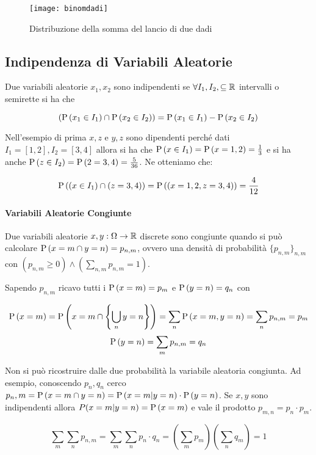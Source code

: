 \begin{figure}[H]
	\centering
	\caption{Distribuzione della somma del lancio di due dadi}
	\texttt{[image: binomdadi]}
\end{figure}


\subsection{Indipendenza di Variabili Aleatorie}

Due variabili aleatorie $ x_1, x_2 $ sono indipendenti se $ \forall I_1, I_2, \subseteq \mathbb{R} $ intervalli o semirette si ha che 

\[ \left( \text{P}\left(x_1 \in I_1\right) \cap \text{P}\left(x_2 \in I_2\right) \right) = \text{P}\left(x_1 \in I_1\right) - \text{P}\left(x_2 \in I_2\right) \]

Nell'esempio di prima $ x, z $ e $ y,z $ sono dipendenti perché dati $ I_1 = [1,2], I_2 = [3,4] $ allora si ha che $ \text{P}\left(x\in I_1\right) = \text{P}\left(x=1,2\right) = \frac{1}{3} $ e si ha anche $ \text{P}\left(z \in I_2\right) = \text{P}\left(2 = 3,4\right) = \frac{5}{36} $. Ne otteniamo che:


\[ \text{P}\left((x \in I_1) \cap (z = 3,4)\right) = \text{P}\left((x = 1,2, z = 3,4)\right) = \dfrac{4}{12} \]

\paragraph{Variabili Aleatorie Congiunte}
Due variabili aleatorie $ x,y : \Omega \to \mathbb{R} $ discrete sono congiunte quando si può calcolare $ \text{P}\left(x = m \cap y = n\right) = p_{n,m} $, ovvero una densità di probabilità $ \{ p_{n,m} \}_{n,m} $ con $ (p_{n,m} \geq 0 ) \land (\sum_{n,m} p_{n,m} = 1) $.

Sapendo $ p_{n,m} $ ricavo tutti i $ \text{P}\left(x=m\right) = p_m $ e $ \text{P}\left(y = n\right) = q_n $ con

\[ \text{P}\left(x=m\right) = \text{P}\left(x = m \cap \left\{ \bigcup_{n} y=n \right\}\right) = \sum_{n} \text{P}\left(x=m,y=n\right) = \sum_n p_{n,m} = p_m \]
\[ \text{P}\left(y=n\right) = \sum_{m} p_{n,m} = q_n \]

Non si può ricostruire dalle due probabilità la variabile aleatoria congiunta. Ad esempio, conoscendo $ p_n,q_n $ cerco $ p_n,m  = \text{P}\left(x = m \cap y = n\right) = \text{P}\left(x = m | y = n\right) \cdot \text{P}\left(y=n\right) $. Se $ x,y $ sono indipendenti allora $ P(x=m|y=n) = \text{P}\left(x=m\right) $ e vale il prodotto $ p_{m,n} = p_n \cdot p_m $.

\[ \sum_{m}\sum_{n} p_{n,m} = \sum_{m}\sum_{n} p_n \cdot q_n = \left( \sum_{m} p_m \right) \left( \sum_{n} q_m \right) = 1 \]

